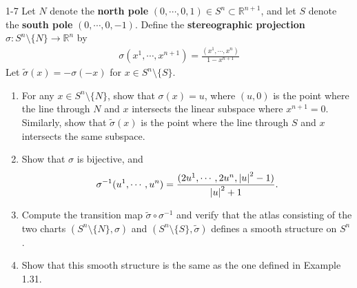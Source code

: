 \begin{customprob}{1-7}
  Let $N$ denote the \textbf{north pole} $(0, \cdots, 0, 1) \in S^n \subset \mathbb{R}^{n + 1}$, and let $S$ denote the \textbf{south pole} $(0, \cdots, 0, -1)$.
  Define the \textbf{stereographic projection} $\sigma: S^n \setminus \{ N \} \rightarrow \mathbb{R}^n$ by
  \begin{align*}
    \sigma(x^1, \cdots, x^{n + 1}) = \frac{(x^1, \cdots, x^n)}{1 - x^{n + 1}}
  \end{align*}
  Let $\tilde{\sigma}(x) = -\sigma(-x)$ for $x \in S^n \setminus \{ S \}$.
  \begin{enumerate}[label=(\alph*)]
    \item 
      For any $x \in S^n \setminus \{ N \}$, show that $\sigma(x) = u$, where $(u, 0)$ is the point where the line through $N$ and $x$ intersects the linear subspace where $x^{n + 1} = 0$.
      Similarly, show that $\tilde{\sigma}(x)$ is the point where the line through $S$ and $x$ intersects the same subspace.
    \item
      Show that $\sigma$ is bijective, and
      \begin{align*}
        \sigma^{-1}(u^1, \cdots, u^n) = \frac{(2u^1, \cdots, 2u^n, \abs{u}^2 - 1)}{\abs{u}^2 + 1}.
      \end{align*}
    \item
      Compute the transition map $\tilde{\sigma} \circ \sigma^{-1}$ and verify that the atlas consisting of the two charts $(S^n \setminus \{ N \}, \sigma)$ and $(S^n \setminus \{ S \}, \tilde{\sigma})$ defines a smooth structure on $S^n$.
    \item
      Show that this smooth structure is the same as the one defined in Example 1.31.
  \end{enumerate}
\end{customprob}

